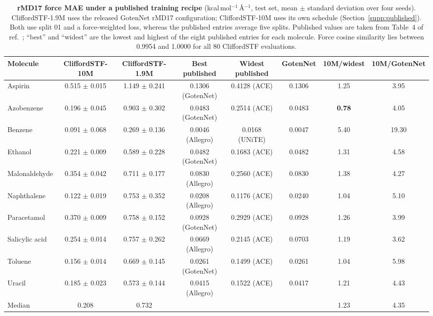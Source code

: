 \begin{table}[!htbp]
\centering
\caption{\textbf{rMD17 force MAE under a published training recipe} (kcal\,mol$^{-1}$\,\AA$^{-1}$, test set, mean $\pm$ standard deviation over four seeds). CliffordSTF-1.9M uses the released GotenNet rMD17 configuration; CliffordSTF-10M uses its own schedule (Section~\ref{supp:published}). Both use split 01 and a force-weighted loss, whereas the published entries average five splits. Published values are taken from Table~4 of ref.~; ``best'' and ``widest'' are the lowest and highest of the eight published entries for each molecule. Force cosine similarity lies between 0.9954 and 1.0000 for all 80 CliffordSTF evaluations.}
\label{tab:published}
\small
\begin{tabular}{lccccccc}
\toprule
Molecule & CliffordSTF-10M & CliffordSTF-1.9M & Best published & Widest published & GotenNet & 10M/widest & 10M/GotenNet \\
\midrule
Aspirin & 0.515 $\pm$ 0.015 & 1.149 $\pm$ 0.241 & 0.1306 (GotenNet) & 0.4128 (ACE) & 0.1306 & 1.25 & 3.95 \\
Azobenzene & 0.196 $\pm$ 0.045 & 0.903 $\pm$ 0.302 & 0.0483 (GotenNet) & 0.2514 (ACE) & 0.0483 & \textbf{0.78} & 4.05 \\
Benzene & 0.091 $\pm$ 0.068 & 0.269 $\pm$ 0.136 & 0.0046 (Allegro) & 0.0168 (UNiTE) & 0.0047 & 5.40 & 19.30 \\
Ethanol & 0.221 $\pm$ 0.009 & 0.589 $\pm$ 0.228 & 0.0482 (GotenNet) & 0.1683 (ACE) & 0.0482 & 1.31 & 4.58 \\
Malonaldehyde & 0.354 $\pm$ 0.042 & 0.711 $\pm$ 0.177 & 0.0830 (Allegro) & 0.2560 (ACE) & 0.0830 & 1.38 & 4.27 \\
Naphthalene & 0.122 $\pm$ 0.019 & 0.753 $\pm$ 0.352 & 0.0208 (Allegro) & 0.1176 (ACE) & 0.0240 & 1.04 & 5.10 \\
Paracetamol & 0.370 $\pm$ 0.009 & 0.758 $\pm$ 0.152 & 0.0928 (GotenNet) & 0.2929 (ACE) & 0.0928 & 1.26 & 3.99 \\
Salicylic acid & 0.254 $\pm$ 0.014 & 0.757 $\pm$ 0.262 & 0.0669 (Allegro) & 0.2145 (ACE) & 0.0703 & 1.19 & 3.62 \\
Toluene & 0.156 $\pm$ 0.014 & 0.669 $\pm$ 0.145 & 0.0261 (GotenNet) & 0.1499 (ACE) & 0.0261 & 1.04 & 5.98 \\
Uracil & 0.185 $\pm$ 0.023 & 0.573 $\pm$ 0.144 & 0.0415 (Allegro) & 0.1522 (ACE) & 0.0417 & 1.21 & 4.43 \\
\midrule
Median & 0.208 & 0.732 & & & & 1.23 & 4.35 \\
\bottomrule
\end{tabular}
\end{table}

